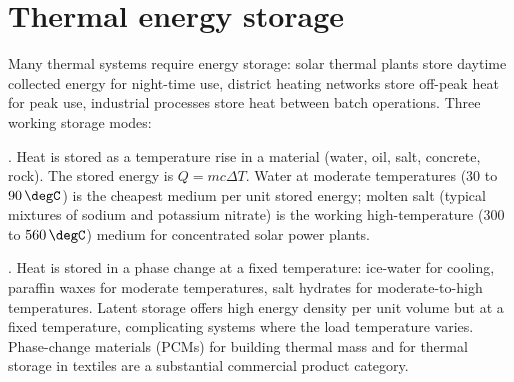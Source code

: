 \section{Thermal energy storage}

Many thermal systems require energy storage: solar thermal plants
store daytime collected energy for night-time use, district heating
networks store off-peak heat for peak use, industrial processes
store heat between batch operations. Three working storage modes:

. Heat is stored as a temperature rise
in a material (water, oil, salt, concrete, rock). The stored energy
is $Q = m c \Delta T$. Water at moderate temperatures ($30$ to $90\,
\degC$) is the cheapest medium per unit stored energy; molten salt
(typical mixtures of sodium and potassium nitrate) is the working
high-temperature ($300$ to $560\,\degC$) medium for concentrated
solar power plants.

. Heat is stored in a phase change at a
fixed temperature: ice-water for cooling, paraffin waxes for moderate
temperatures, salt hydrates for moderate-to-high temperatures. Latent
storage offers high energy density per unit volume but at a fixed
temperature, complicating systems where the load temperature varies.
Phase-change materials (PCMs) for building thermal mass and for
thermal storage in textiles are a substantial commercial product
category.

